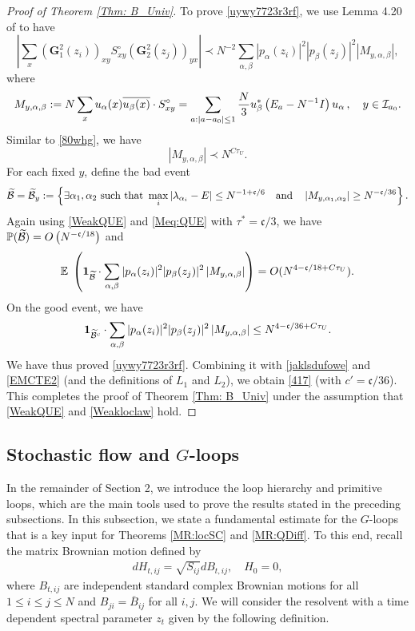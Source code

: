 \documentclass[10pt,reqno]{article}
\renewcommand{\bar}{\overline}
\theoremstyle{plain} %
\theoremstyle{remark}
\numberwithin{equation}{section}
\begin{document}
\begin{proof}[Proof of Theorem \ref{Thm: B_Univ}]
To prove  \eqref{uywy7723r3rf}, we use  Lemma 4.20 of \cite{Xu:2024aa}  to have 
$$
  \left|  \sum_{  x}\left(\mathbf{G}_1^2\left(z_i\right)\right)_{xy} S_{x y}^{\circ}\left(\mathbf{G}_2^2\left(z_j\right)\right)_{yx}\right|
\prec N^{-2} \sum_{\alpha,\beta} |p_\alpha(z_i)|^2|p_\beta(z_j)|^2 \left|M_{y,\alpha,\beta}\right|,
$$
where
 $$
 M_{y,\alpha,\beta}:= N \sum_{x}u_\alpha(x) \overline{u_{\beta}(x)}\cdot S^\circ_{xy}= \sum_{a: |a-a_0|\le 1}\frac N 3
       u^*_\beta \left(E_a-N^{-1} I\right)u_\alpha \,, \quad y\in {\cal I}_{a_0}.
$$
Similar to \eqref{80whg}, we have
$$
    \left|M_{y,\alpha,\beta}\right|\prec N^{C\tau_U}.
$$
For each fixed $y$, define the bad event 
$$
\widetilde{\cal B}=\widetilde{\cal B}_y:=\left\{\exists \alpha_1,\alpha_2 \mbox { such that } \max_i|\lambda_{\alpha_i}-E|\le N^{-1+\mathfrak c/6} \quad \mbox {and} \quad \left| M_{y,\alpha_1,\alpha_2}\right|\ge N^{ -\mathfrak c/36}\right\}.
$$
Again using  \eqref{WeakQUE} and \eqref{Meq:QUE} with  $\tau^*=\mathfrak c/3$,  we have 
$\mathbb P (\widetilde{{\cal B}}  )=O\left(N^{-\mathfrak c/18}\right)$ and 
$$
\mathbb E\; \left(
{\bf 1}_{\widetilde{{\cal B}} }\cdot \sum_{\alpha,\beta} |p_\alpha(z_i)|^2|p_\beta(z_j)|^2 \left|M_{y,\alpha,\beta} \right|
\right)
=O( N^{4-\mathfrak c/18+C\tau_U} ).
$$
On the good event, we have 
$$
{\bf 1}_{\widetilde{{\cal B}}^c }\cdot \sum_{\alpha,\beta} |p_\alpha(z_i)|^2|p_\beta(z_j)|^2 \left|M_{y,\alpha,\beta} \right|
\le N^{4-\mathfrak c/36+C\tau_U}.  
$$
We have thus proved  \eqref{uywy7723r3rf}.  
Combining it with \eqref{jaklsdufowe} and \eqref{EMCTE2} (and the definitions of $L_1$ and $L_2$), we obtain \eqref{417} (with $c'=\mathfrak c/36$). 
This completes the proof of  Theorem \ref{Thm: B_Univ}  under the assumption that 
\eqref{WeakQUE} and \eqref{Weakloclaw} hold. 

\end{proof}

\subsection{Stochastic flow and   \texorpdfstring{$G$}{G}-loops}


In the remainder of Section 2, we introduce the loop hierarchy and primitive loops, which are the main tools used to prove the results stated in the preceding subsections.
In this subsection, we state a fundamental estimate for the $G$-loops that is a key input for Theorems \ref{MR:locSC} and \ref{MR:QDiff}. To this end, recall
the matrix Brownian  motion   defined by 
\begin{align}\label{def_mainHT}
dH_{t,ij}=\sqrt{S_{ij}}dB_{t,ij}, \quad H_{0}=0, 
\end{align}
where $B_{t,ij}$ are independent standard complex Brownian motions for all $1\le i\le j\le N$ and  $B_{ji} = \bar  B_{ij}$ for all $i, j$. 
We will consider the resolvent with a time dependent spectral parameter $z_t$ given by the following definition. 
\end{document}

